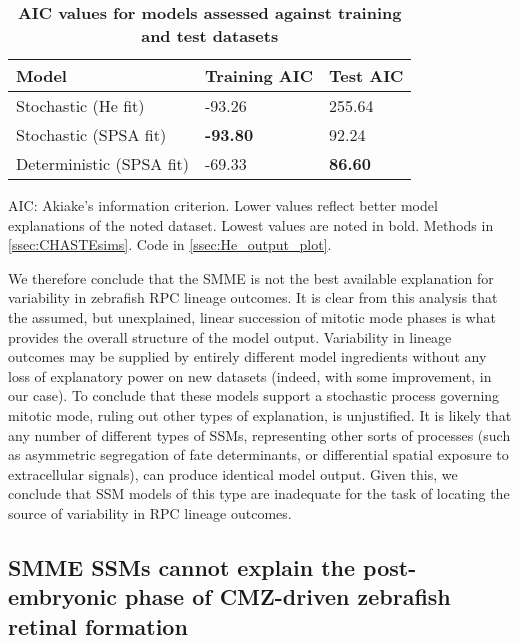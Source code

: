 \begin{table}[!ht]
\centering
\caption{
{\bf AIC values for models assessed against training and test datasets}}
\begin{tabular}{|l|l|l|}
\hline
{\bf Model} & {\bf Training AIC} & {\bf Test AIC} \\ \hline
Stochastic (He fit) & -93.26 & 255.64\\ \hline
Stochastic (SPSA fit) & {\bf -93.80} & 92.24\\ \hline
Deterministic (SPSA fit) & -69.33 & {\bf 86.60}\\ \hline
\end{tabular}
\begin{flushleft} AIC: Akiake's information criterion. Lower values reflect better model explanations of the noted dataset. Lowest values are noted in bold.
Methods in \autoref{ssec:CHASTEsims}.
Code in \autoref{ssec:He_output_plot}.
\end{flushleft}
\label{AICtable}
\end{table}

We therefore conclude that the SMME is not the best available explanation for variability in zebrafish RPC lineage outcomes. It is clear from this analysis that the assumed, but unexplained, linear succession of mitotic mode phases is what provides the overall structure of the model output. Variability in lineage outcomes may be supplied by entirely different model ingredients without any loss of explanatory power on new datasets (indeed, with some improvement, in our case). To conclude that these models support a stochastic process governing mitotic mode, ruling out other types of explanation, is unjustified. It is likely that any number of different types of SSMs, representing other sorts of processes (such as asymmetric segregation of fate determinants, or differential spatial exposure to extracellular signals), can produce identical model output. Given this, we conclude that SSM models of this type are inadequate for the task of locating the source of variability in RPC lineage outcomes.

\subsection{SMME SSMs cannot explain the post-embryonic phase of CMZ-driven zebrafish retinal formation}

